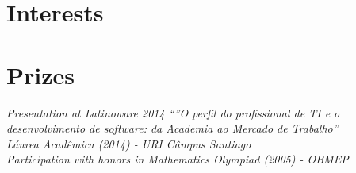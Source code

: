 \documentclass[10pt]{article} %
\begin{document}

\section{Interests}



\section{Prizes}

{
\textit{Presentation at Latinoware 2014 “”O perfil do profissional de TI e o desenvolvimento de software: da Academia ao Mercado de Trabalho”}\\
\textit{Láurea Acadêmica (2014) - URI Câmpus Santiago}\\
\textit{Participation with honors in Mathematics Olympiad (2005) - OBMEP}\\
}

\end{document}
